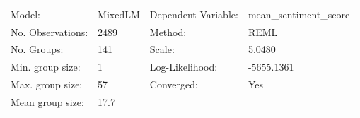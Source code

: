 \begin{tabular}{llll}
\toprule
\midrule
Model: & MixedLM & Dependent Variable: & mean_sentiment_score \\
No. Observations: & 2489 & Method: & REML \\
No. Groups: & 141 & Scale: & 5.0480 \\
Min. group size: & 1 & Log-Likelihood: & -5655.1361 \\
Max. group size: & 57 & Converged: & Yes \\
Mean group size: & 17.7 &  &  \\
\bottomrule
\end{tabular}
